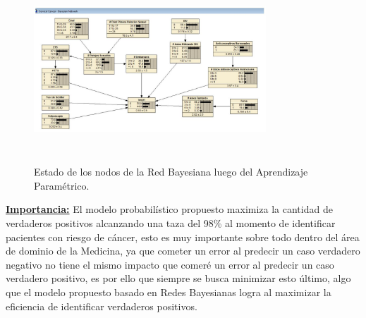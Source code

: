 \documentclass[10pt,conference]{IEEEtran}
\begin{document}
\begin{enumerate}
\begin{figure}[H]
\begin{center}
\includegraphics[width=8.7cm, height=7cm]{figuras/R33.JPG}
\caption{Estado de los nodos de la Red Bayesiana luego del Aprendizaje Paramétrico.}
\label{R33} 
\end{center}
\end{figure}

\textbf{\underline{Importancia:}}
El modelo probabilístico propuesto maximiza la cantidad de verdaderos positivos alcanzando una taza del 98\% al momento de identificar pacientes con riesgo de cáncer, esto es muy importante sobre todo dentro del área de dominio de la Medicina, ya que cometer un error al predecir un caso verdadero negativo no tiene el mismo impacto que comeré un error al predecir un caso verdadero positivo, es por ello que siempre se busca minimizar esto último, algo que el modelo propuesto basado en Redes Bayesianas logra al maximizar la eficiencia de identificar verdaderos positivos. \par


\end{enumerate}
\end{document}
